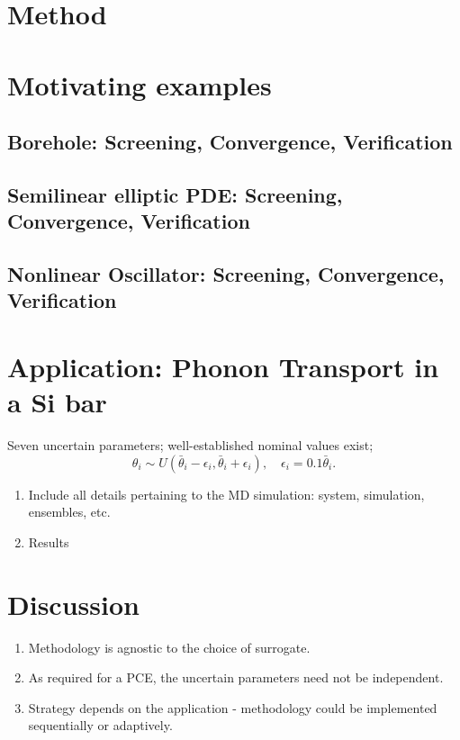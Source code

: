 \documentclass[letter,12pt]{article}
\begin{document}


\tableofcontents





\section{Method}

\section{Motivating examples}
\subsection{Borehole: Screening, Convergence, Verification}
\subsection{Semilinear elliptic PDE: Screening, Convergence, Verification}
\subsection{Nonlinear Oscillator: Screening, Convergence, Verification}

\section{Application: Phonon Transport in a Si bar}

Seven uncertain parameters; well-established nominal values exist;
\[
   \theta_i \sim U(\bar\theta_i - \epsilon_i, \bar\theta_i + \epsilon_i), 
   \quad \epsilon_i = 0.1 \bar\theta_i. 
\]
\begin{enumerate}
\item Include all details pertaining to the MD simulation: system, simulation, 
ensembles, etc. 
\item Results
\end{enumerate}

\section{Discussion}
\begin{enumerate}
\item Methodology is agnostic to the choice of surrogate.
\item As required for a PCE, the uncertain parameters need not be independent. 
\item Strategy depends on the application - methodology could be implemented 
sequentially or adaptively. 
\end{enumerate}
\end{document}

